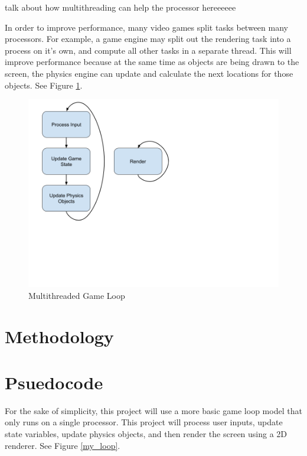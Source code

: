 \documentclass[a4paper, 12pt]{article}
\begin{document}
        talk about how multithreading can help the processor hereeeeee

        In order to improve performance, many video games split tasks between many processors. For example, a game engine may split out the rendering task into a process on it's own, and compute all other tasks in a separate thread. This will improve performance because at the same time as objects are being drawn to the screen, the physics engine can update and calculate the next locations for those objects. See Figure \ref{multithread_loop}.

        \begin{figure}[H]
            \includegraphics[width=12cm]{multithread_loop.png}
            \centering
            \caption{Multithreaded Game Loop}
            \label{multithread_loop}
        \end{figure}



\section{Methodology}
    \section{Psuedocode}
        For the sake of simplicity, this project will use a more basic game loop model that only runs on a single processor. This project will process user inputs, update state variables, update physics objects, and then render the screen using a 2D renderer. See Figure \ref{my_loop}.
\end{document}
